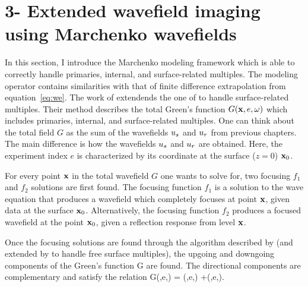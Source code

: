 \newpage
\section{3- Extended wavefield imaging using Marchenko wavefields}




In this section, I introduce the Marchenko modeling framework which is able to correctly
handle primaries, internal, and surface-related multiples. The modeling operator
contains similarities with that of finite difference extrapolation from 
equation~\ref{eq:we}.
 The work of \cite{Singh2015} extendends the one of \cite{Fil2012} to handle surface-related
multiples. Their method
describes the total Green's function $G({\bf x},e,\omega)$ which includes
primaries, internal, and surface-related multiples. One can think about the total
field $G$ as the sum of the wavefields $u_s$ and $u_r$ from previous chapters. 
 The main difference is how the wavefields $u_s$ and $u_r$ are obtained. 
 Here, the experiment index $e$ is characterized by its coordinate at the 
surface ($z=0$) ${\bf x}_0$. 


For every point ${\bf x}$ in the total wavefield $G$ one wants to solve for, two focusing $f_1$ and $f_2$ solutions are first found. 
The focusing function $f_1$ is a solution to the wave equation that produces a wavefield which completely 
focuses at point ${\bf x}$, given data at the surface ${\bf x}_0$. Alternatively, the focusing function
 $f_2$ produces a focused wavefield at the point ${\bf x}_0$, given a reflection response 
from level ${\bf x}$. 

Once the focusing solutions are found through the algorithm described by \cite{wapenaar2014green} (and 
extended by \cite{Singh2015} to handle free surface multiples), the upgoing and downgoing 
components of the Green's function G are found. The directional components are complementary and satisfy 
the relation
\beq
 G(\xx,e,\omega) = \US(\xx,e,\omega) +\UR(\xx,e,\omega).
\eeq

